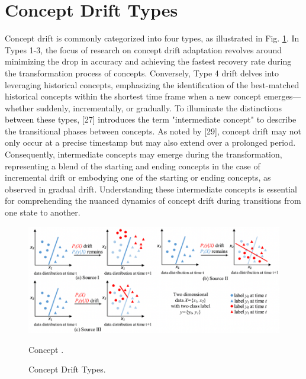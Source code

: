 \section{Concept Drift Types}
\label{sec:background_concept_drift_types}
Concept drift is commonly categorized into four types, as illustrated in Fig. \ref{fig:concept-drift-types}. In Types 1-3, the focus of research on concept drift adaptation revolves around minimizing the drop in accuracy and achieving the fastest recovery rate during the transformation process of concepts. Conversely, Type 4 drift delves into leveraging historical concepts, emphasizing the identification of the best-matched historical concepts within the shortest time frame when a new concept emerges—whether suddenly, incrementally, or gradually. To illuminate the distinctions between these types, [27] introduces the term "intermediate concept" to describe the transitional phases between concepts. As noted by [29], concept drift may not only occur at a precise timestamp but may also extend over a prolonged period. Consequently, intermediate concepts may emerge during the transformation, representing a blend of the starting and ending concepts in the case of incremental drift or embodying one of the starting or ending concepts, as observed in gradual drift. Understanding these intermediate concepts is essential for comprehending  the nuanced dynamics of concept drift during transitions from one state to another.
 
\begin{figure}[!ht]
    \centering
    \includegraphics[width=.9\textwidth]{2_Background/figures/concept_drift_sources.png}
    \caption{Concept .}
    \caption{Concept Drift Types.}
    \label{fig:concept-drift-types}
\end{figure}


